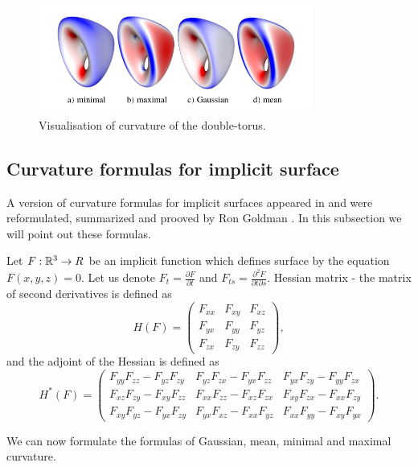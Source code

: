 \begin{figure}
    \centerline{\includegraphics[width=0.8\textwidth]{images/img16}}
    \caption[Visualisation of curvature of the double-torus]
    {Visualisation of curvature of the double-torus.}
    \label{img:16}
\end{figure}

\subsection*{Curvature formulas for implicit surface}

A version of curvature formulas for implicit surfaces appeared in \cite{spivak1975comprehensive}
and were reformulated, summarized and prooved by Ron Goldman \cite{goldman2005curvature}.
In this subsection we will point out these formulas.

Let $F:\mathbb{R}^3 \to R$ be an implicit function which defines surface by the equation $F(x, y, z) = 0$. 
Let us denote $F_t = \frac{\partial F}{\partial t}$ and $F_{ts} = \frac{\partial^2 F}{\partial t \partial s}$.
Hessian matrix - the matrix of second derivatives is defined as 
$$
H(F) = 
\begin{pmatrix}
    F_{xx} & F_{xy} & F_{xz}\\
    F_{yx} & F_{yy} & F_{yz}\\
    F_{zx} & F_{zy} & F_{zz}
\end{pmatrix},
$$
and the adjoint of the Hessian is defined as
$$
H^*(F) = 
\begin{pmatrix}
    F_{yy} F_{zz} - F_{yz} F_{zy} & F_{yz} F_{zx} - F_{yx} F_{zz} & F_{yx} F_{zy} - F_{yy} F_{zx}\\
    F_{xz} F_{zy} - F_{xy} F_{zz} & F_{xx} F_{zz} - F_{xz} F_{zx} & F_{xy} F_{zx} - F_{xx} F_{zy}\\
    F_{xy} F_{yz} - F_{yx} F_{zy} & F_{yx} F_{xz} - F_{xx} F_{yz} & F_{xx} F_{yy} - F_{xy} F_{yx}
\end{pmatrix}.
$$

We can now formulate the formulas of Gaussian, mean, minimal and maximal curvature.

